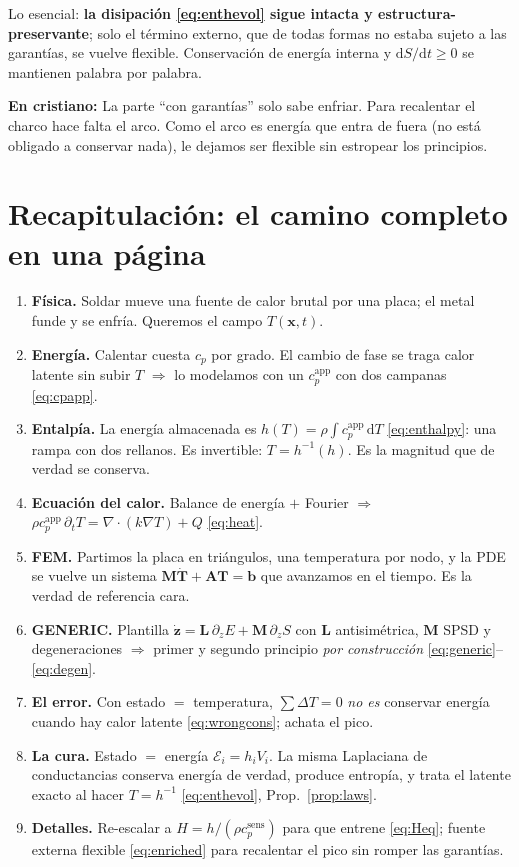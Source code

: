 \documentclass[11pt]{article}
\newcommand{\dd}{\mathrm{d}}
\newcommand{\grad}{\nabla}
\newcommand{\cpapp}{c_p^{\mathrm{app}}}
\newcommand{\cpsens}{c_p^{\mathrm{sens}}}
\theoremstyle{definition}
\theoremstyle{plain}
\newcommand{\dummies}[1]{%
  \par\smallskip\noindent
  \colorbox{yellow!18}{\parbox{\dimexpr\linewidth-2\fboxsep}{%
  \small\textbf{En cristiano:} #1}}\par\smallskip}
\begin{document}
Lo esencial: \textbf{la disipación \eqref{eq:enthevol} sigue intacta y
estructura-preservante}; solo el término externo, que de todas formas no estaba
sujeto a las garantías, se vuelve flexible. Conservación de energía interna y
$\dd S/\dd t\ge0$ se mantienen palabra por palabra.

\dummies{La parte ``con garantías'' solo sabe enfriar. Para recalentar el charco
hace falta el arco. Como el arco es energía que entra de fuera (no está obligado a
conservar nada), le dejamos ser flexible sin estropear los principios.}

\section{Recapitulación: el camino completo en una página}
\label{sec:resumen}

\begin{enumerate}[leftmargin=1.6em]
  \item \textbf{Física.} Soldar mueve una fuente de calor brutal por una placa; el
  metal funde y se enfría. Queremos el campo $T(\bm x,t)$.
  \item \textbf{Energía.} Calentar cuesta $c_p$ por grado. El cambio de fase se
  traga calor latente sin subir $T$ $\Rightarrow$ lo modelamos con un $\cpapp$ con
  dos campanas \eqref{eq:cpapp}.
  \item \textbf{Entalpía.} La energía almacenada es $h(T)=\rho\int\cpapp\,\dd T$
  \eqref{eq:enthalpy}: una rampa con dos rellanos. Es invertible: $T=h^{-1}(h)$.
  Es la magnitud que de verdad se conserva.
  \item \textbf{Ecuación del calor.} Balance de energía $+$ Fourier $\Rightarrow$
  $\rho\cpapp\,\partial_t T=\grad\!\cdot\!(k\grad T)+Q$ \eqref{eq:heat}.
  \item \textbf{FEM.} Partimos la placa en triángulos, una temperatura por nodo, y
  la PDE se vuelve un sistema $\bm M\dot{\bm T}+\bm A\bm T=\bm b$ que avanzamos en
  el tiempo. Es la verdad de referencia cara.
  \item \textbf{GENERIC.} Plantilla $\dot{\bm z}=\bm L\,\partial_z E+\bm
  M\,\partial_z S$ con $\bm L$ antisimétrica, $\bm M$ SPSD y degeneraciones
  $\Rightarrow$ primer y segundo principio \emph{por construcción}
  \eqref{eq:generic}--\eqref{eq:degen}.
  \item \textbf{El error.} Con estado $=$ temperatura, $\sum\Delta T=0$ \emph{no es}
  conservar energía cuando hay calor latente \eqref{eq:wrongcons}; achata el pico.
  \item \textbf{La cura.} Estado $=$ energía $\mathcal E_i=h_iV_i$. La misma
  Laplaciana de conductancias conserva energía de verdad, produce entropía, y trata
  el latente exacto al hacer $T=h^{-1}$ \eqref{eq:enthevol}, Prop.~\ref{prop:laws}.
  \item \textbf{Detalles.} Re-escalar a $H=h/(\rho\cpsens)$ para que entrene
  \eqref{eq:Heq}; fuente externa flexible \eqref{eq:enriched} para recalentar el
  pico sin romper las garantías.
\end{enumerate}
\end{document}
